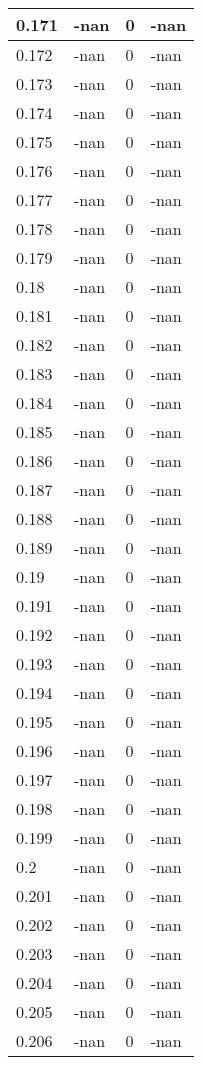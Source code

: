 \documentclass[a4paper,14pt]{extarticle}
\begin{document}
\begin{longtable}{||m{3cm}||m{3cm}|m{3cm}||m{3cm}||}
\hline
0.171 & -nan & 0 & -nan\\
\hline
0.172 & -nan & 0 & -nan\\
\hline
0.173 & -nan & 0 & -nan\\
\hline
0.174 & -nan & 0 & -nan\\
\hline
0.175 & -nan & 0 & -nan\\
\hline
0.176 & -nan & 0 & -nan\\
\hline
0.177 & -nan & 0 & -nan\\
\hline
0.178 & -nan & 0 & -nan\\
\hline
0.179 & -nan & 0 & -nan\\
\hline
0.18 & -nan & 0 & -nan\\
\hline
0.181 & -nan & 0 & -nan\\
\hline
0.182 & -nan & 0 & -nan\\
\hline
0.183 & -nan & 0 & -nan\\
\hline
0.184 & -nan & 0 & -nan\\
\hline
0.185 & -nan & 0 & -nan\\
\hline
0.186 & -nan & 0 & -nan\\
\hline
0.187 & -nan & 0 & -nan\\
\hline
0.188 & -nan & 0 & -nan\\
\hline
0.189 & -nan & 0 & -nan\\
\hline
0.19 & -nan & 0 & -nan\\
\hline
0.191 & -nan & 0 & -nan\\
\hline
0.192 & -nan & 0 & -nan\\
\hline
0.193 & -nan & 0 & -nan\\
\hline
0.194 & -nan & 0 & -nan\\
\hline
0.195 & -nan & 0 & -nan\\
\hline
0.196 & -nan & 0 & -nan\\
\hline
0.197 & -nan & 0 & -nan\\
\hline
0.198 & -nan & 0 & -nan\\
\hline
0.199 & -nan & 0 & -nan\\
\hline
0.2 & -nan & 0 & -nan\\
\hline
0.201 & -nan & 0 & -nan\\
\hline
0.202 & -nan & 0 & -nan\\
\hline
0.203 & -nan & 0 & -nan\\
\hline
0.204 & -nan & 0 & -nan\\
\hline
0.205 & -nan & 0 & -nan\\
\hline
0.206 & -nan & 0 & -nan\\

\end{longtable}
\end{document}
